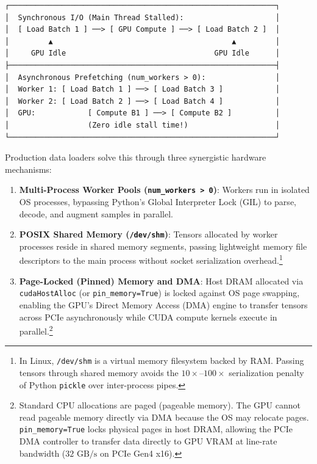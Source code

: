 \documentclass[
  letterpaper,
]{scrbook}
\providecommand{\tightlist}{%
  \setlength{\itemsep}{0pt}\setlength{\parskip}{0pt}}
\begin{document}
\begin{verbatim}
┌─────────────────────────────────────────────────────────────┐
│  Synchronous I/O (Main Thread Stalled):                     │
│  [ Load Batch 1 ] ──> [ GPU Compute ] ──> [ Load Batch 2 ]  │
│         ▲                                         ▲         │
│     GPU Idle                                  GPU Idle      │
├─────────────────────────────────────────────────────────────┤
│  Asynchronous Prefetching (num_workers > 0):                │
│  Worker 1: [ Load Batch 1 ] ──> [ Load Batch 3 ]            │
│  Worker 2: [ Load Batch 2 ] ──> [ Load Batch 4 ]            │
│  GPU:            [ Compute B1 ] ──> [ Compute B2 ]          │
│                  (Zero idle stall time!)                    │
└─────────────────────────────────────────────────────────────┘
\end{verbatim}

Production data loaders solve this through three synergistic hardware
mechanisms:

\begin{enumerate}
\def\labelenumi{\arabic{enumi}.}
\tightlist
\item
  \textbf{Multi-Process Worker Pools
  (\texttt{num\_workers\ \textgreater{}\ 0})}: Workers run in isolated
  OS processes, bypassing Python's Global Interpreter Lock (GIL) to
  parse, decode, and augment samples in parallel.
\item
  \textbf{POSIX Shared Memory (\texttt{/dev/shm})}: Tensors allocated by
  worker processes reside in shared memory segments, passing lightweight
  memory file descriptors to the main process without socket
  serialization overhead.\footnote{In Linux, \texttt{/dev/shm} is a
    virtual memory filesystem backed by RAM. Passing tensors through
    shared memory avoids the \(10\times\text{--}100\times\)
    serialization penalty of Python \texttt{pickle} over inter-process
    pipes.}
\item
  \textbf{Page-Locked (Pinned) Memory and DMA}: Host DRAM allocated via
  \texttt{cudaHostAlloc} (or \texttt{pin\_memory=True}) is locked
  against OS page swapping, enabling the GPU's Direct Memory Access
  (DMA) engine to transfer tensors across PCIe asynchronously while CUDA
  compute kernels execute in parallel.\footnote{Standard CPU allocations
    are paged (pageable memory). The GPU cannot read pageable memory
    directly via DMA because the OS may relocate pages.
    \texttt{pin\_memory=True} locks physical pages in host DRAM,
    allowing the PCIe DMA controller to transfer data directly to GPU
    VRAM at line-rate bandwidth (\(32\text{ GB/s}\) on PCIe Gen4 x16).}
\end{enumerate}
\end{document}
